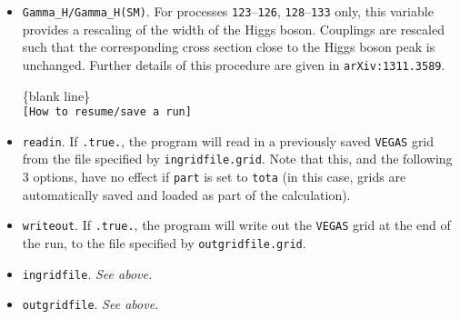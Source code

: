\documentclass[12pt]{article}
\begin{document}
\begin{itemize}
\begin{center}
\{blank line\} \\
{\tt [Anomalous width of the Higgs] }
\end{center}

\item {\tt Gamma\_H/Gamma\_H(SM)}. For processes {\tt 123}--{\tt 126}, {\tt 128}--{\tt 133} only,
this variable provides a rescaling of the width of the Higgs boson.  Couplings are rescaled such that the
corresponding cross section close to the Higgs boson peak is unchanged.  Further details of this procedure are given in
{\tt arXiv:1311.3589}.

\begin{center}
\{blank line\} \\
{\tt [How to resume/save a run] }
\end{center}

\item {\tt readin}. If {\tt .true.}, the program will read in a
previously saved {\tt VEGAS} grid from the file specified by
{\tt ingridfile.grid}. Note that this, and the following 3 options,
have no effect if {\tt part} is set to {\tt tota} (in this case, grids
are automatically saved and loaded as part of the calculation).

\item {\tt writeout}. If {\tt .true.}, the program will write out
the {\tt VEGAS} grid at the end of the run, to the file specified by
{\tt outgridfile.grid}.

\item {\tt ingridfile}.  {\it See above.}

\item {\tt outgridfile}.  {\it See above.}

\end{itemize}
\end{document}
